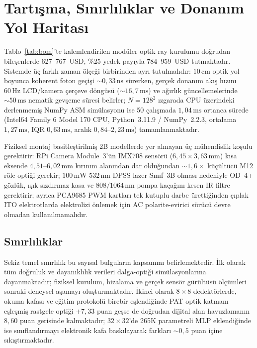 \documentclass[journal]{IEEEtran}
\begin{document}
\section{Tart\i{}\c{s}ma, S\i{}n\i{}rl\i{}l\i{}klar ve Donan\i{}m Yol Haritas\i{}}

Tablo~\ref{tab:bom}'te kalemlendirilen mod\"uler optik ray kurulumu do\u{g}rudan bile\c{s}enlerde 627--767~USD, \%25 yedek pay\i{}yla 784--959~USD tutmaktad\i{}r. Sistemde \"u\c{c} farkl\i{} zaman \"ol\c{c}e\u{g}i birbirinden ayr\i{} tutulmal\i{}d\i{}r: $10\,\text{cm}$ optik yol boyunca koherent foton ge\c{c}i\c{s}i $\sim 0{,}33\,\text{ns}$ s\"urerken, ger\c{c}ek donan\i{}m ak\i{}\c{s} h\i{}z\i{}n\i{} $60\,\text{Hz}$ LCD/kamera \c{c}er\c{c}eve d\"ong\"us\"u ($\sim 16{,}7\,\text{ms}$) ve a\u{g}\i{}rl\i{}k g\"uncellemelerinde $\sim 50\,\text{ms}$ nematik gev\c{s}eme s\"uresi belirler; $N=128^2$ \i{}zgarada CPU \"uzerindeki derlenmemi\c{s} NumPy ASM sim\"ulasyonu ise 50 \c{c}al\i{}\c{s}mada $1{,}04\,\text{ms}$ ortanca s\"urede (Intel64 Family 6 Model 170 CPU, Python~3.11.9 / NumPy~2.2.3, ortalama $1{,}27\,\text{ms}$, IQR $0{,}63\,\text{ms}$, aral\i{}k $0{,}84\text{--}2{,}23\,\text{ms}$) tamamlanmaktad\i{}r.

Fiziksel montaj basitle\c{s}tirilmi\c{s} 2B modellerde yer almayan \"u\c{c} m\"uhendislik ko\c{s}ulu gerektirir: RPi Camera Module~3'\"un IMX708 sens\"or\"u ($6{,}45 \times 3{,}63\,\text{mm}$) k\i{}sa eksende $4{,}51\text{--}6{,}02\,\text{mm}$ k\i{}r\i{}n\i{}m alan\i{}ndan dar oldu\u{g}undan $\sim 1{,}6\times$ k\"u\c{c}\"ult\"uc\"u M12 r\"ole opti\u{g}i gerekir; $100\,\text{mW}$ $532\,\text{nm}$ DPSS lazer S\i{}n\i{}f~3B olmas\i{} nedeniyle OD~4+ g\"ozl\"uk, \i{}\c{s}\i{}k s\i{}zd\i{}rmaz kasa ve $808/1064\,\text{nm}$ pompa ka\c{c}a\u{g}\i{}n\i{} kesen IR filtre gerektirir; ayr\i{}ca PCA9685 PWM kartlar\i{} tek kutuplu darbe \"uretti\u{g}inden \c{c}\i{}plak ITO elektrotlarda elektrolizi \"onlemek i\c{c}in AC polarite-evirici s\"ur\"uc\"u devre olmadan kullan\i{}lmamal\i{}d\i{}r.

\subsection{S\i{}n\i{}rl\i{}l\i{}klar}
Sekiz temel s\i{}n\i{}rl\i{}l\i{}k bu say\i{}sal bulgular\i{}n kapsam\i{}n\i{} belirlemektedir. \.{I}lk olarak t\"um do\u{g}ruluk ve dayan\i{}kl\i{}l\i{}k verileri dalga-opti\u{g}i sim\"ulasyonlar\i{}na dayanmaktad\i{}r; fiziksel kurulum, hizalama ve ger\c{c}ek sens\"or g\"ur\"ult\"us\"u \"ol\c{c}\"umleri sonraki deneysel a\c{s}amay\i{} olu\c{s}turmaktad\i{}r. \.{I}kinci olarak $8\times 8$ dedekt\"orlerde, okuma kafas\i{} ve e\u{g}itim protokol\"u birebir e\c{s}lendi\u{g}inde PAT optik katman\i{} e\c{s}le\c{s}mi\c{s} rastgele opti\u{g}i $+7{,}33$ puan ge\c{s}se de do\u{g}rudan dijital alan havuzlaman\i{}n $8{,}60$ puan gerisinde kalmaktad\i{}r; $32\times 32$'de 265K parametreli MLP eklendi\u{g}inde ise s\i{}n\i{}fland\i{}rmay\i{} elektronik kafa bask\i{}layarak farklar\i{} $\sim 0{,}5$ puan i\c{c}ine s\i{}k\i{}\c{s}t\i{}rmaktad\i{}r.
\end{document}
